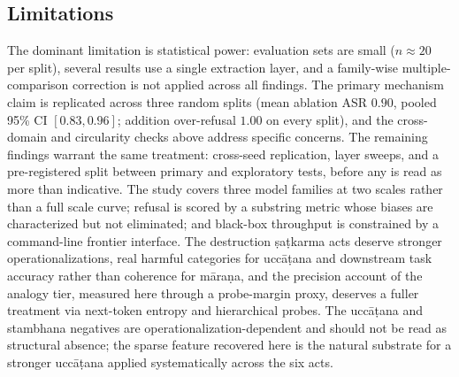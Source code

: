 \subsection{Limitations}
The dominant limitation is statistical power: evaluation sets are small ($n\approx 20$
per split), several results use a single extraction layer, and a family-wise
multiple-comparison correction is not applied across all findings. The primary
mechanism claim is replicated across three random splits (mean ablation ASR $0.90$,
pooled 95\% CI $[0.83,0.96]$; addition over-refusal $1.00$ on every split), and the
cross-domain and circularity checks above address specific concerns. The remaining
findings warrant the same treatment: cross-seed replication, layer sweeps, and a
pre-registered split between primary and exploratory tests, before any is read
as more than indicative. The study covers three model families at two scales rather
than a full scale curve; refusal is scored by a substring metric whose biases are
characterized but not eliminated; and black-box throughput is constrained by a
command-line frontier interface. The destruction \d{s}a\d{t}karma acts deserve
stronger operationalizations, real harmful categories for ucc\=a\d{t}ana and
downstream task accuracy rather than coherence for m\=ara\d{n}a, and the precision
account of the analogy tier, measured here through a probe-margin proxy, deserves a
fuller treatment via next-token entropy and hierarchical probes. The ucc\=a\d{t}ana
and stambhana negatives are operationalization-dependent and should not be read as
structural absence; the sparse feature recovered here is the natural substrate for a
stronger ucc\=a\d{t}ana applied systematically across the six acts.

